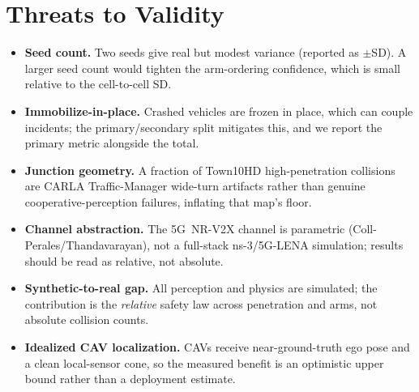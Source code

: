 \documentclass[11pt]{article}
\begin{document}
\section{Threats to Validity}
\label{sec:threats}
\begin{itemize}[leftmargin=1.3em,itemsep=0.15em,topsep=0.2em]
  \item \textbf{Seed count.} Two seeds give real but modest variance (reported as
  $\pm$SD). A larger seed count would tighten the arm-ordering confidence, which is
  small relative to the cell-to-cell SD.
  \item \textbf{Immobilize-in-place.} Crashed vehicles are frozen in place, which
  can couple incidents; the primary/secondary split mitigates this, and we report
  the primary metric alongside the total.
  \item \textbf{Junction geometry.} A fraction of Town10HD high-penetration
  collisions are CARLA Traffic-Manager wide-turn artifacts rather than genuine
  cooperative-perception failures, inflating that map's floor.
  \item \textbf{Channel abstraction.} The 5G~NR-V2X channel is parametric
  (Coll-Perales/Thandavarayan), not a full-stack ns-3/5G-LENA simulation; results
  should be read as relative, not absolute.
  \item \textbf{Synthetic-to-real gap.} All perception and physics are simulated;
  the contribution is the \emph{relative} safety law across penetration and arms,
  not absolute collision counts.
  \item \textbf{Idealized CAV localization.} CAVs receive near-ground-truth ego
  pose and a clean local-sensor cone, so the measured benefit is an optimistic
  upper bound rather than a deployment estimate.
\end{itemize}

\end{document}
